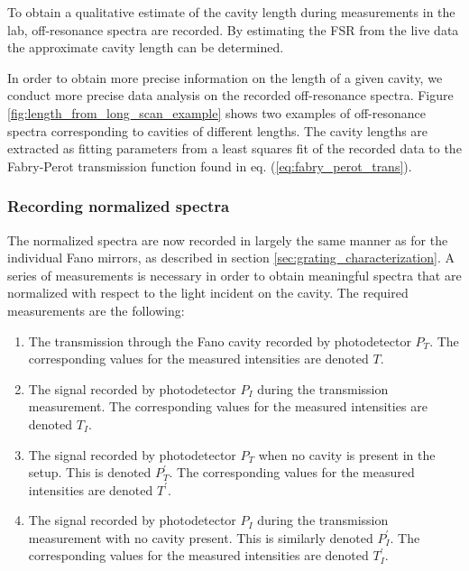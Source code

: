 To obtain a qualitative estimate of the cavity length during measurements in the lab, off-resonance spectra are recorded. By estimating the FSR from the live data the approximate cavity length can be determined.  

In order to obtain more precise information on the length of a given cavity, we conduct more precise data analysis on the recorded off-resonance spectra. Figure \ref{fig:length_from_long_scan_example} shows two examples of off-resonance spectra corresponding to cavities of different lengths. The cavity lengths are extracted as fitting parameters from a least squares fit of the recorded data to the Fabry-Perot transmission function found in eq. (\ref{eq:fabry_perot_trans}). 

\subsubsection{Recording normalized spectra}

The normalized spectra are now recorded in largely the same manner as for the individual Fano mirrors, as described in section \ref{sec:grating_characterization}. A series of measurements is necessary in order to obtain meaningful spectra that are normalized with respect to the light incident on the cavity. The required measurements are the following: 
\begin{enumerate}
    \item The transmission through the Fano cavity recorded by photodetector $P_T$. The corresponding values for the measured intensities are denoted $T$.
    \item The signal recorded by photodetector $P_I$ during the transmission measurement. The corresponding values for the measured intensities are denoted $T_I$.
    \item The signal recorded by photodetector $P_T$ when no cavity is present in the setup. This is denoted $P_T^{\prime}$. The corresponding values for the measured intensities are denoted $T^{\prime}$.
    \item The signal recorded by photodetector $P_I$ during the transmission measurement with no cavity present. This is similarly denoted $P_I^{\prime}$. The corresponding values for the measured intensities are denoted $T_I^{\prime}$.
\end{enumerate}


